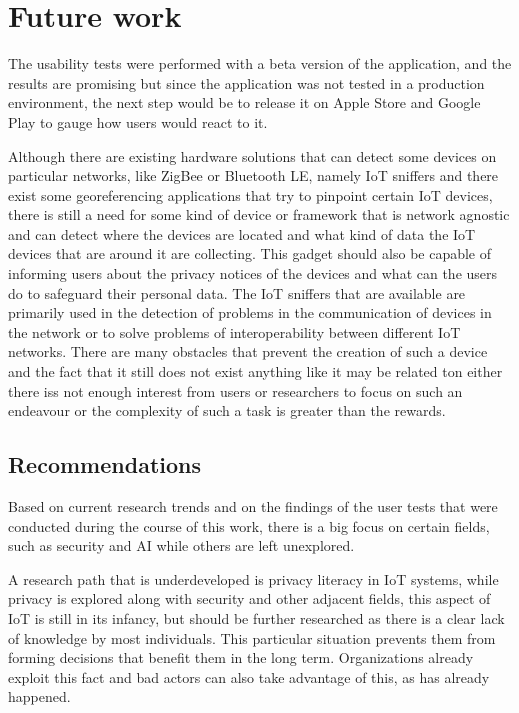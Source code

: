 %
%
\section{Future work}\label{section:future_work}

The usability tests were performed with a beta version of the application,
and the results are promising but since the application was not tested in a production environment,
the next step would be to release it on Apple Store and Google Play to
gauge how users would react to it.

Although there are existing hardware solutions that can detect some devices
on particular networks, like ZigBee or Bluetooth LE, namely IoT sniffers
and there exist some georeferencing applications that try to pinpoint certain
IoT devices, there is still a need for some kind of device or framework
that is network agnostic and can detect where the devices are located and
what kind of data the IoT devices that are around it are collecting. This
gadget should also be capable of informing users about the privacy notices
of the devices and what can the users do to safeguard their personal data.
The IoT sniffers that are available are primarily used in the detection
of problems in the communication of devices in the network or to solve problems
of interoperability between different IoT networks. There are many obstacles
that prevent the creation of such a device and the fact that it still does
not exist anything like it may be related ton either there iss not enough
interest from users or researchers to focus on such an endeavour or the
complexity of such a task is greater than the rewards.

\subsection{Recommendations}

Based on current research trends and on the findings of the user tests that were
conducted during the course of this work, there is a big focus on certain
fields, such as security and AI while others are left unexplored.

A research path that is underdeveloped is privacy literacy in IoT systems,
while privacy is explored along with security and other adjacent fields, this aspect of IoT
is still in its infancy, but should be further researched as there is a
clear lack of knowledge by most individuals. This particular situation prevents
them from forming decisions that benefit them in the long term. Organizations
already exploit this fact and bad actors can also take advantage of this, as
has already happened.

